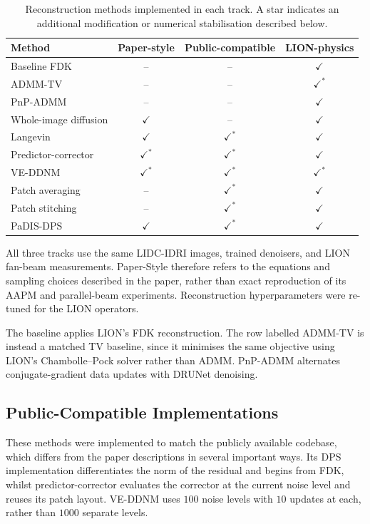 \begin{table}[ht]
  \centering
  \caption{Reconstruction methods implemented in each track. A star indicates an additional modification or numerical stabilisation described below.}
  \label{tab:methods_by_implementation}
  \begin{tabular}{lccc}
  \hline
  \textbf{Method} & \textbf{Paper-style} & \textbf{Public-compatible} & \textbf{LION-physics} \\
  \hline
  Baseline FDK              & --             & --             & \(\checkmark\) \\
  ADMM-TV                   & --             & --             & \(\checkmark^*\) \\
  PnP-ADMM                  & --             & --             & \(\checkmark\) \\
  Whole-image diffusion     & \(\checkmark\) & --             & \(\checkmark\) \\
  Langevin                  & \(\checkmark\) & \(\checkmark^*\) & \(\checkmark\) \\
  Predictor-corrector       & \(\checkmark^*\) & \(\checkmark^*\) & \(\checkmark\) \\
  VE-DDNM                   & \(\checkmark^*\) & \(\checkmark^*\) & \(\checkmark^*\) \\
  Patch averaging           & --             & \(\checkmark^*\) & \(\checkmark\) \\
  Patch stitching           & --             & \(\checkmark^*\) & \(\checkmark\) \\
  PaDIS-DPS                 & \(\checkmark\) & \(\checkmark^*\) & \(\checkmark\) \\
  \hline
  \end{tabular}
\end{table}

All three tracks use the same LIDC-IDRI images, trained denoisers, and LION fan-beam measurements. Paper-Style therefore refers to the equations and sampling choices described in the paper, rather than exact reproduction of its AAPM and parallel-beam experiments. Reconstruction hyperparameters were re-tuned for the LION operators.

The baseline applies LION's FDK reconstruction. The row labelled ADMM-TV is instead a matched TV baseline, since it minimises the same objective using LION's Chambolle--Pock solver rather than ADMM. PnP-ADMM alternates conjugate-gradient data updates with DRUNet denoising.

\subsection{Public-Compatible Implementations}
\label{subsec:public-compatible-implementation}
These methods were implemented to match the publicly available codebase, which differs from the paper descriptions in several important ways. Its DPS implementation differentiates the norm of the residual and begins from FDK, whilst predictor-corrector evaluates the corrector at the current noise level and reuses its patch layout. VE-DDNM uses $100$ noise levels with $10$ updates at each, rather than $1000$ separate levels.

